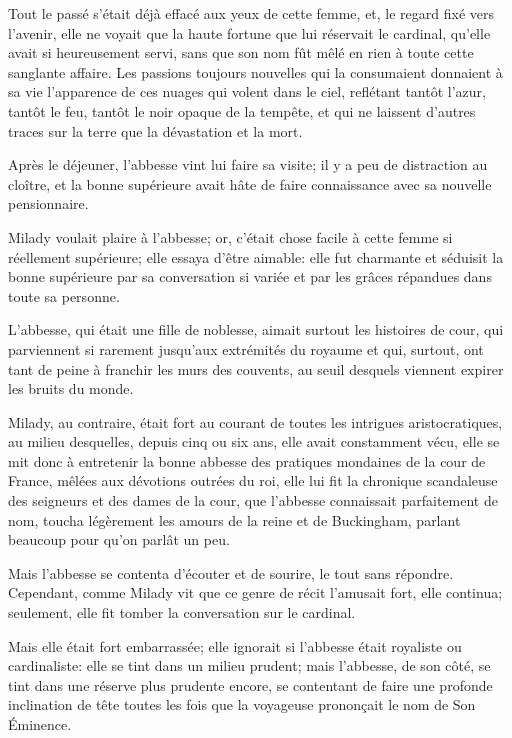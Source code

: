 Tout le passé s'était déjà effacé aux yeux de cette femme, et, le regard fixé vers l'avenir, elle ne voyait que la haute fortune que lui réservait le cardinal, qu'elle avait si heureusement servi, sans que son nom fût mêlé en rien à toute cette sanglante affaire. Les passions toujours nouvelles qui la consumaient donnaient à sa vie l'apparence de ces nuages qui volent dans le ciel, reflétant tantôt l'azur, tantôt le feu, tantôt le noir opaque de la tempête, et qui ne laissent d'autres traces sur la terre que la dévastation et la mort. 

Après le déjeuner, l'abbesse vint lui faire sa visite; il y a peu de distraction au cloître, et la bonne supérieure avait hâte de faire connaissance avec sa nouvelle pensionnaire. 

Milady voulait plaire à l'abbesse; or, c'était chose facile à cette femme si réellement supérieure; elle essaya d'être aimable: elle fut charmante et séduisit la bonne supérieure par sa conversation si variée et par les grâces répandues dans toute sa personne. 

L'abbesse, qui était une fille de noblesse, aimait surtout les histoires de cour, qui parviennent si rarement jusqu'aux extrémités du royaume et qui, surtout, ont tant de peine à franchir les murs des couvents, au seuil desquels viennent expirer les bruits du monde. 

Milady, au contraire, était fort au courant de toutes les intrigues aristocratiques, au milieu desquelles, depuis cinq ou six ans, elle avait constamment vécu, elle se mit donc à entretenir la bonne abbesse des pratiques mondaines de la cour de France, mêlées aux dévotions outrées du roi, elle lui fit la chronique scandaleuse des seigneurs et des dames de la cour, que l'abbesse connaissait parfaitement de nom, toucha légèrement les amours de la reine et de Buckingham, parlant beaucoup pour qu'on parlât un peu. 

Mais l'abbesse se contenta d'écouter et de sourire, le tout sans répondre. Cependant, comme Milady vit que ce genre de récit l'amusait fort, elle continua; seulement, elle fit tomber la conversation sur le cardinal. 

Mais elle était fort embarrassée; elle ignorait si l'abbesse était royaliste ou cardinaliste: elle se tint dans un milieu prudent; mais l'abbesse, de son côté, se tint dans une réserve plus prudente encore, se contentant de faire une profonde inclination de tête toutes les fois que la voyageuse prononçait le nom de Son Éminence. 

